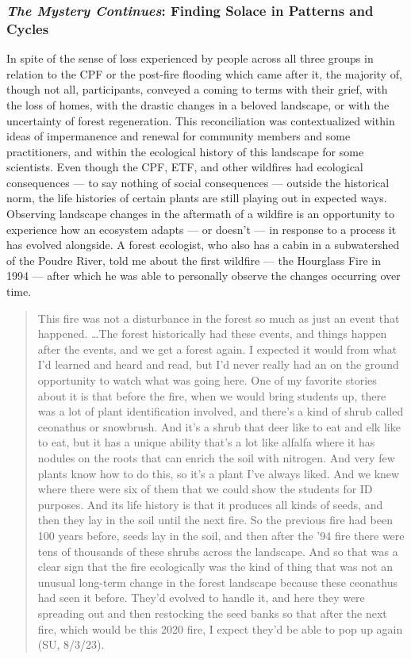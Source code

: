 \documentclass[
]{article}
\begin{document}
\subsubsection{\texorpdfstring{\emph{The Mystery Continues}: Finding Solace in Patterns and Cycles}{The Mystery Continues: Finding Solace in Patterns and Cycles}}\label{the-mystery-continues-finding-solace-in-patterns-and-cycles}

In spite of the sense of loss experienced by people across all three groups in relation to the CPF or the post-fire flooding which came after it, the majority of, though not all, participants, conveyed a coming to terms with their grief, with the loss of homes, with the drastic changes in a beloved landscape, or with the uncertainty of forest regeneration. This reconciliation was contextualized within ideas of impermanence and renewal for community members and some practitioners, and within the ecological history of this landscape for some scientists. Even though the CPF, ETF, and other wildfires had ecological consequences --- to say nothing of social consequences --- outside the historical norm, the life histories of certain plants are still playing out in expected ways. Observing landscape changes in the aftermath of a wildfire is an opportunity to experience how an ecosystem adapts --- or doesn't --- in response to a process it has evolved alongside. A forest ecologist, who also has a cabin in a subwatershed of the Poudre River, told me about the first wildfire --- the Hourglass Fire in 1994 --- after which he was able to personally observe the changes occurring over time.

\begin{quote}
This fire was not a disturbance in the forest so much as just an event that happened. \ldots The forest historically had these events, and things happen after the events, and we get a forest again. I expected it would from what I'd learned and heard and read, but I'd never really had an on the ground opportunity to watch what was going here. One of my favorite stories about it is that before the fire, when we would bring students up, there was a lot of plant identification involved, and there's a kind of shrub called ceonathus or snowbrush. And it's a shrub that deer like to eat and elk like to eat, but it has a unique ability that's a lot like alfalfa where it has nodules on the roots that can enrich the soil with nitrogen. And very few plants know how to do this, so it's a plant I've always liked. And we knew where there were six of them that we could show the students for ID purposes. And its life history is that it produces all kinds of seeds, and then they lay in the soil until the next fire. So the previous fire had been 100 years before, seeds lay in the soil, and then after the '94 fire there were tens of thousands of these shrubs across the landscape. And so that was a clear sign that the fire ecologically was the kind of thing that was not an unusual long-term change in the forest landscape because these ceonathus had seen it before. They'd evolved to handle it, and here they were spreading out and then restocking the seed banks so that after the next fire, which would be this 2020 fire, I expect they'd be able to pop up again (SU, 8/3/23).
\end{quote}
\end{document}
